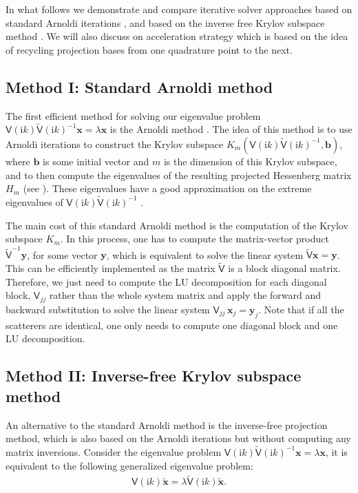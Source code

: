 In what follows we demonstrate and compare iterative solver approaches based on standard Arnoldi iterations \cite{arnoldi1951principle, MR3396212}, and based on the 
inverse free Krylov subspace method \cite{golub2002inverse, money2005algorithm}.
We will also discuss on acceleration strategy which is based on the idea of recycling projection bases from one quadrature point to the next. 
\subsection{Method I: Standard Arnoldi method}
The first efficient method for solving our eigenvalue problem $\mathsf{V}(\mathrm{i}k)\tilde{\mathsf{V}}(\mathrm{i}k)^{-1}\boldsymbol{x} = \lambda\boldsymbol{x}$ 
is the Arnoldi method \cite[Section 6.2]{MR3396212}. The idea of this method is to use Arnoldi iterations to construct the Krylov subspace  
$K_{m}(\mathsf{V}(\mathrm{i}k)\tilde{\mathsf{V}}(\mathrm{i}k)^{-1}, \boldsymbol{b})$, where $\boldsymbol{b}$ is some 
initial vector and $m$ is the dimension of this Krylov subspace, and to then compute the eigenvalues of the resulting projected Hessenberg matrix $H_m$ (see \cite{saad2011numerical}).
These eigenvalues have a good approximation on the extreme eigenvalues of $\mathsf{V}(\mathrm{i}k)\tilde{\mathsf{V}}(\mathrm{i}k)^{-1}$ \cite[Proposition 6.10, Theorem 6.8]{MR3396212}. 

The main cost of this standard Arnoldi method is the computation of the Krylov subspace $K_{m}$. In this process, one has to compute the matrix-vector product 
$\tilde{\mathsf{V}}^{-1}\boldsymbol{y}$, for some vector $\boldsymbol{y}$, which is equivalent to solve the linear system $\tilde{\mathsf{V}}\boldsymbol{x} = \boldsymbol{y}$. This can be 
efficiently implemented as the matrix $\tilde{\mathsf{V}}$ is a block diagonal matrix. Therefore, we just need to compute the LU decomposition for each diagonal 
block, $\mathsf{V}_{jj}$ rather than the whole system matrix and apply the forward and backward substitution to solve the linear system 
$\mathsf{V}_{jj}\,\boldsymbol{x}_j = \boldsymbol{y}_j$. Note that if all the scatterers are identical, one only needs to compute one diagonal block and one LU decomposition. 

\subsection{Method II: Inverse-free Krylov subspace method}
An alternative to the standard Arnoldi method is the inverse-free projection method, which is also based on the Arnoldi iterations but without computing any 
matrix inversions. Consider the eigenvalue problem $\mathsf{V}(\mathrm{i}k)\tilde{\mathsf{V}}(\mathrm{i}k)^{-1}\boldsymbol{x} = \lambda\boldsymbol{x}$,
it is equivalent to the following generalized eigenvalue problem:
\begin{align}\label{GEP}
    \mathsf{V}(\mathrm{i}k)\tilde{\boldsymbol{x}} = \lambda \tilde{\mathsf{V}}(\mathrm{i}k)\tilde{\boldsymbol{x}}.
\end{align}

